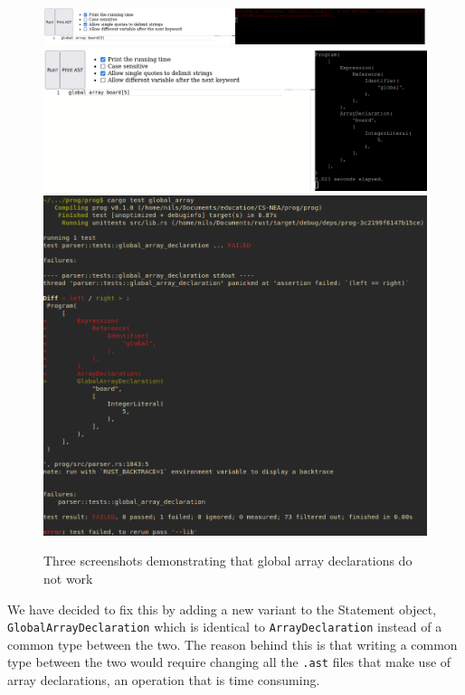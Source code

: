 \documentclass{article}
\begin{document}
\begin{figure}
	\includegraphics[width=\textwidth]{global_array_declaration_failing_run}
	\includegraphics[width=\textwidth]{global_array_declaration_failing_ast}
	\includegraphics[width=\textwidth]{global_array_declaration_failing_test}
	\caption{Three screenshots demonstrating that global array declarations do
	not work}
	\label{fig:global_array_declaration_failing}
\end{figure}

We have decided to fix this by adding a new variant to the Statement object,
\texttt{GlobalArrayDeclaration} which is identical to
\texttt{ArrayDeclaration} instead of a common type between the two. The reason
behind this is that writing a common type between the two would require
changing all  the \texttt{.ast} files that make use of array declarations, an
operation that is time consuming.
\end{document}
